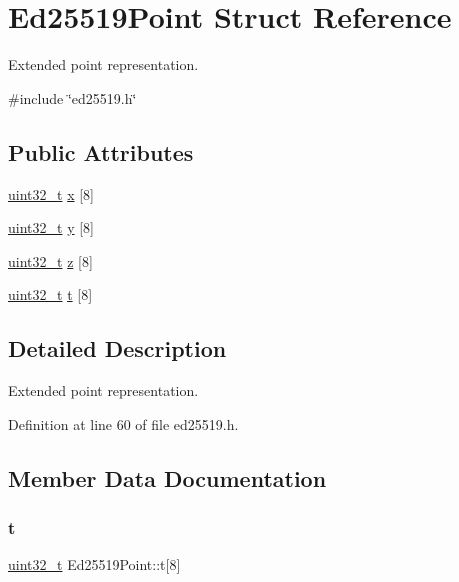 \hypertarget{structEd25519Point}{}\section{Ed25519\+Point Struct Reference}
\label{structEd25519Point}


Extended point representation.  




{\ttfamily \#include \char`\"{}ed25519.\+h\char`\"{}}

\subsection*{Public Attributes}
\begin{DoxyCompactItemize}
\item 
\hyperlink{stdint_8h_a435d1572bf3f880d55459d9805097f62}{uint32\+\_\+t} \hyperlink{structEd25519Point_ada4075918f73fe13ceaf4b3631549ce8}{x} \mbox{[}8\mbox{]}
\item 
\hyperlink{stdint_8h_a435d1572bf3f880d55459d9805097f62}{uint32\+\_\+t} \hyperlink{structEd25519Point_a54af56f591402668e6a50d1ae0d4fcd0}{y} \mbox{[}8\mbox{]}
\item 
\hyperlink{stdint_8h_a435d1572bf3f880d55459d9805097f62}{uint32\+\_\+t} \hyperlink{structEd25519Point_ab7af3d9e39f190e82b2927bdc269ba98}{z} \mbox{[}8\mbox{]}
\item 
\hyperlink{stdint_8h_a435d1572bf3f880d55459d9805097f62}{uint32\+\_\+t} \hyperlink{structEd25519Point_a54ab7260c44bc9595d03a6829b4bfd18}{t} \mbox{[}8\mbox{]}
\end{DoxyCompactItemize}


\subsection{Detailed Description}
Extended point representation. 

Definition at line 60 of file ed25519.\+h.



\subsection{Member Data Documentation}
\mbox{\label{structEd25519Point_a54ab7260c44bc9595d03a6829b4bfd18}} 
\subsubsection{\texorpdfstring{t}{t}}
{\footnotesize\ttfamily \hyperlink{stdint_8h_a435d1572bf3f880d55459d9805097f62}{uint32\+\_\+t} Ed25519\+Point\+::t\mbox{[}8\mbox{]}}



